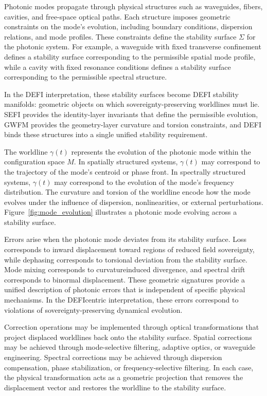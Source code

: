 \documentclass[aip,adv,reprint,floatfix]{revtex4-2}
\begin{document}
Photonic modes propagate through physical structures
such as waveguides, fibers, cavities, and free-space optical
paths.\cite{DuttonElectronField2026} Each structure imposes geometric constraints on
the mode’s evolution, including boundary conditions, dispersion relations, and mode profiles. These constraints
define the stability surface $\Sigma$ for the photonic system. For
example, a waveguide with fixed transverse confinement
defines a stability surface corresponding to the permissible spatial mode profile, while a cavity with fixed resonance conditions defines a stability surface corresponding
to the permissible spectral structure.

In the DEFI interpretation, these stability surfaces become DEFI stability manifolds: geometric objects on
which sovereignty-preserving worldlines must lie.\cite{DuttonSEFI2026}
SEFI
provides the identity-layer invariants that define the permissible evolution, GWFM provides the geometry-layer
curvature and torsion constraints, and DEFI binds these
structures into a single unified stability requirement.

The worldline $\gamma(t)$ represents the evolution of the photonic mode within the configuration space $M$. In spatially structured systems, $\gamma(t)$ may correspond to the
trajectory of the mode’s centroid or phase front. In spectrally structured systems, $\gamma(t)$ may correspond to the
evolution of the mode’s frequency distribution. The curvature and torsion of the worldline encode how the mode
evolves under the influence of dispersion, nonlinearities,
or external perturbations.\cite{DuttonElectronField2026} Figure~\ref{fig:mode_evolution}
illustrates a photonic mode evolving across a stability surface.

Errors arise when the photonic mode deviates from its
stability surface.\cite{DuttonElectronField2026} Loss corresponds to inward displacement toward regions of reduced field sovereignty, while
dephasing corresponds to torsional deviation from the
stability surface. Mode mixing corresponds to curvatureinduced divergence, and spectral drift corresponds to binormal displacement. These geometric signatures provide a unified description of photonic errors that is independent of specific physical mechanisms. In the DEFIcentric interpretation, these errors correspond to violations of sovereignty-preserving dynamical evolution.

Correction operations may be implemented through
optical transformations that project displaced worldlines
back onto the stability surface.\cite{DuttonElectronField2026} Spatial corrections may
be achieved through mode-selective filtering, adaptive
optics, or waveguide engineering. Spectral corrections
may be achieved through dispersion compensation, phase
stabilization, or frequency-selective filtering. In each
case, the physical transformation acts as a geometric projection that removes the displacement vector and restores
the worldline to the stability surface.
\end{document}
